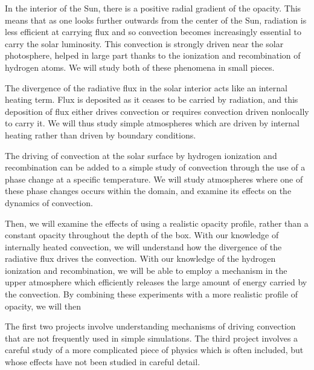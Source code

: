 \documentclass[aasms,12pt]{article}
\begin{document}
In the interior of the Sun, there is a positive radial gradient of the opacity.  This means
that as one looks further outwards from the center of the Sun, radiation is less efficient at
carrying flux and so convection becomes increasingly essential to carry the solar luminosity.
This convection is strongly driven near the solar photosphere, helped in large part thanks to
the ionization and recombination of hydrogen atoms. We will study both of these phenomena in
small pieces.  

The divergence of the radiative flux in the solar interior acts like an
internal heating term.  Flux is deposited as it ceases to be carried by radiation, and this
deposition of flux either drives convection or requires convection driven nonlocally to carry
it.  We will thus study simple atmospheres which are driven by internal heating rather than
driven by boundary conditions.

The driving of convection at the solar surface by hydrogen ionization and recombination can
be added to a simple study of convection through the use of a phase change at a specific temperature.
We will study atmospheres where one of these phase changes occurs within the domain, and
examine its effects on the dynamics of convection.

Then, we will examine the effects of using a realistic opacity profile, rather than a constant
opacity throughout the depth of the box.  With our knowledge of internally heated convection,
we will understand how the divergence of the radiative flux drives the convection.  With our
knowledge of the hydrogen ionization and recombination, we will be able to employ a mechanism in the
upper atmosphere which efficiently releases the large amount of energy carried by the convection.
By combining these experiments with a more realistic profile of opacity, we will then

The first two projects involve understanding mechanisms of driving convection that are not
frequently used in simple simulations.  The third project involves a careful study of a
more complicated piece of physics which is often included, but whose effects have not
been studied in careful detail.
\end{document}
